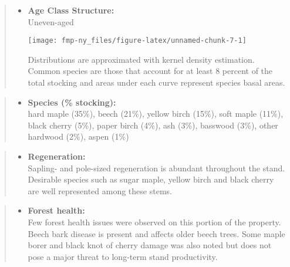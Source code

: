 \documentclass[]{tufte-handout}
\providecommand{\tightlist}{%
  \setlength{\itemsep}{0pt}\setlength{\parskip}{0pt}}
\begin{document}
\begin{quote}
\begin{itemize}
\tightlist
\item
  \textbf{Age Class Structure:}\\
  \vspace{2pt} Uneven-aged\\

  \begin{marginfigure}
  \texttt{[image: fmp-ny\_files/figure-latex/unnamed-chunk-7-1]} \caption[Distributions are approximated with kernel density estimation]{Distributions are approximated with kernel density estimation. Common species are those that account for at least 8 percent of the total stocking and areas under each curve represent species basal areas.}\label{fig:unnamed-chunk-7}
  \end{marginfigure}
\end{itemize}
\end{quote}

\begin{quote}
\begin{itemize}
\tightlist
\item
  \textbf{Species (\% stocking):}\\
  \vspace{2pt} hard maple (35\%), beech (21\%), yellow birch (15\%),
  soft maple (11\%), black cherry (5\%), paper birch (4\%), ash (3\%),
  basswood (3\%), other hardwood (2\%), aspen (1\%)
\end{itemize}
\end{quote}

\begin{quote}
\begin{itemize}
\tightlist
\item
  \textbf{Regeneration:}\\
  \vspace{2pt} Sapling- and pole-sized regeneration is abundant
  throughout the stand. Desirable species such as sugar maple, yellow
  birch and black cherry are well represented among these stems.
\end{itemize}
\end{quote}

\begin{quote}
\begin{itemize}
\tightlist
\item
  \textbf{Forest health:}\\
  \vspace{2pt} Few forest health issues were observed on this portion of
  the property. Beech bark disease is present and affects older beech
  trees. Some maple borer and black knot of cherry damage was also noted
  but does not pose a major threat to long-term stand productivity.
\end{itemize}
\end{quote}
\end{document}

